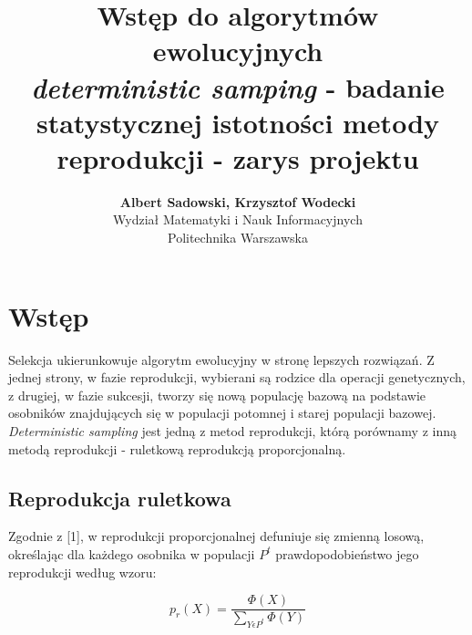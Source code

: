 \documentclass[a4paper]{article}
\title{\textbf{
	Wstęp do algorytmów ewolucyjnych \\
	{\em deterministic samping}} - badanie statystycznej istotności metody reprodukcji - zarys projektu}
\author{\textbf{Albert Sadowski, Krzysztof Wodecki}\\
	Wydział Matematyki i Nauk Informacyjnych\\
	Politechnika Warszawska}
\begin{document}
	\maketitle
	\section{Wstęp}	
	Selekcja ukierunkowuje algorytm ewolucyjny w stronę lepszych rozwiązań. Z jednej strony, w fazie reprodukcji, wybierani są rodzice dla operacji genetycznych, z drugiej, w fazie sukcesji, tworzy się nową populację bazową na podstawie osobników znajdujących się w populacji potomnej  i starej populacji bazowej. {\em Deterministic sampling} jest jedną z metod reprodukcji, którą porównamy z inną metodą reprodukcji - ruletkową reprodukcją proporcjonalną.

		\subsection{Reprodukcja ruletkowa}
	Zgodnie z [1], w reprodukcji proporcjonalnej defuniuje się zmienną losową, określając dla każdego osobnika w populacji $P^t$ prawdopodobieństwo jego reprodukcji według wzoru:

	\begin{equation}
		p_r(X) = \frac{\Phi(X)}{\sum_{Y \epsilon P^t}{\Phi(Y)}}
	\end{equation}
\end{document}
